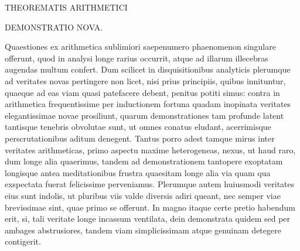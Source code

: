 %
\begin{center}\Large THEOREMATIS ARITHMETICI\end{center}

\begin{center}\large DEMONSTRATIO NOVA.\end{center}

\BookRule{35mm}


Quaestiones ex arithmetica sublimiori saepenumero phaenomenon singulare offerunt, quod in analysi longe rarius occurrit, atque ad illarum illecebras augendas multum confert.  Dum scilicet in disquisitionibus analyticis plerumque ad veritates novas pertingere non licet, nisi prius principiis, quibus innituntur, quaeque ad eas viam quasi patefacere debent, penitus potiti simus: contra in arithmetica frequentissime per inductionem fortuna quadam inopinata veritates elegantissimae novae prosiliunt, quarum demonstrationes tam profunde latent tantisque tenebris obvolutae sunt, ut omnes conatus eludant, acerrimisque perscrutationibus aditum denegent.  Tantus porro adest tamque mirus inter veritates arithmeticas, primo aspectu maxime heterogeneas, nexus, ut haud raro, dum longe alia quaerimus, tandem ad demonstrationem tantopere exoptatam longisque antea meditationibus frustra quaesitam longe alia via quam qua exspectata fuerat felicissime perveniamus.  Plerumque autem huiusmodi veritates eius sunt indolis, ut pluribus viis valde diversis adiri queant, nec semper viae brevissimae sint, quae primo se offerunt.  In magno itaque certe pretio habendum erit, si, tali veritate longe incassum ventilata, dein demonstrata quidem sed per ambages abstrusiores, tandem viam simplicissimam atque genuinam detegere contigerit.


